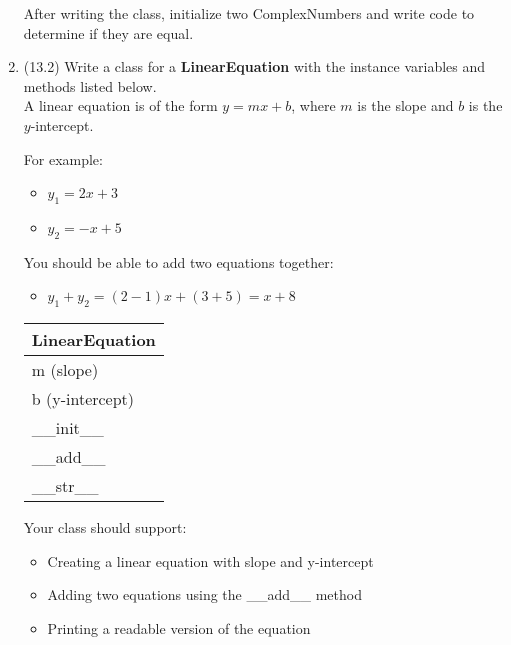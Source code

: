 \documentclass{article}
\begin{document}
\begin{enumerate}
		After writing the class, initialize two ComplexNumbers and write code to determine if
		they are equal.



\item (13.2)
		Write a class for a \textbf{LinearEquation} with the instance variables and methods listed 
		below.\\ A linear equation is of the form $y = mx + b$, where $m$ is the slope and $b$ is 
		the $y$-intercept.

		\begin{minipage}[t]{0.65\textwidth}
				For example:
			\begin{itemize}
				\item $y_1 = 2x + 3$
				\item $y_2 = -x + 5$
			\end{itemize}
			You should be able to add two equations together:
			\begin{itemize}
				\item $y_1 + y_2 = (2 - 1)x + (3 + 5) = x + 8$
			\end{itemize}
		\end{minipage}
		\hfill
		\begin{minipage}[t]{0.32\textwidth}
			\vspace{0.2em}
			\begin{flushright}
				\begin{tabular}{|l|}
					\hline
					LinearEquation \\ \hline
					m (slope) \\
					b (y-intercept) \\ \hline
					\_\_init\_\_ \\
					\_\_add\_\_ \\
					\_\_str\_\_ \\ \hline
				\end{tabular}
			\end{flushright}
		\end{minipage}
		
		Your class should support:
		\begin{itemize}
			\item Creating a linear equation with slope and y-intercept
			\item Adding two equations using the \_\_add\_\_ method
			\item Printing a readable version of the equation
		\end{itemize}
		

\end{enumerate}
\end{document}
